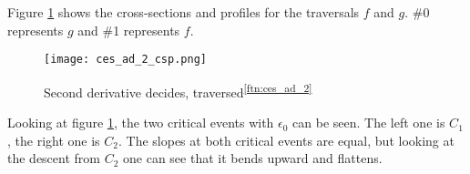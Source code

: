 	Figure \ref{fig:ces_ad_2_csp} shows the cross-sections and profiles for the traversals $f$ and $g$. \#0 represents $g$ and \#1 represents $f$.
	
\begin{figure}[H]
	\centering
    
    \texttt{[image: ces\_ad\_2\_csp.png]}
		
	\caption{Second derivative decides, traversed\textsuperscript{\ref{ftn:ces_ad_2}}}
    \label{fig:ces_ad_2_csp}
\end{figure}
	
	Looking at figure \ref{fig:ces_ad_2_csp}, the two critical events with $\epsilon_0$ can be seen. The left one is $C_1$, the right one is $C_2$. The slopes at both critical events are equal, but looking at the descent from $C_2$ one can see that it bends upward and flattens.


